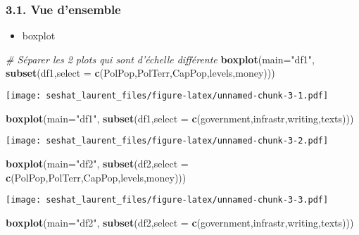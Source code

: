 \documentclass[
]{article}
\newenvironment{Shaded}{\begin{snugshade}}{\end{snugshade}}
\newcommand{\CommentTok}[1]{\textcolor[rgb]{0.56,0.35,0.01}{\textit{#1}}}
\newcommand{\DataTypeTok}[1]{\textcolor[rgb]{0.13,0.29,0.53}{#1}}
\newcommand{\KeywordTok}[1]{\textcolor[rgb]{0.13,0.29,0.53}{\textbf{#1}}}
\newcommand{\NormalTok}[1]{#1}
\newcommand{\StringTok}[1]{\textcolor[rgb]{0.31,0.60,0.02}{#1}}
\providecommand{\tightlist}{%
  \setlength{\itemsep}{0pt}\setlength{\parskip}{0pt}}
\begin{document}
\hypertarget{vue-densemble}{%
\subsubsection{3.1. Vue d'ensemble}\label{vue-densemble}}

\begin{itemize}
\tightlist
\item
  boxplot
\end{itemize}

\begin{Shaded}
\begin{Highlighting}[]
\CommentTok{# Séparer les 2 plots qui sont d'échelle différente}
\KeywordTok{boxplot}\NormalTok{(}\DataTypeTok{main=}\StringTok{"df1"}\NormalTok{, }\KeywordTok{subset}\NormalTok{(df1,}\DataTypeTok{select =} \KeywordTok{c}\NormalTok{(PolPop,PolTerr,CapPop,levels,money)))}
\end{Highlighting}
\end{Shaded}

\texttt{[image: seshat\_laurent\_files/figure-latex/unnamed-chunk-3-1.pdf]}

\begin{Shaded}
\begin{Highlighting}[]
\KeywordTok{boxplot}\NormalTok{(}\DataTypeTok{main=}\StringTok{"df1"}\NormalTok{, }\KeywordTok{subset}\NormalTok{(df1,}\DataTypeTok{select =} \KeywordTok{c}\NormalTok{(government,infrastr,writing,texts)))}
\end{Highlighting}
\end{Shaded}

\texttt{[image: seshat\_laurent\_files/figure-latex/unnamed-chunk-3-2.pdf]}

\begin{Shaded}
\begin{Highlighting}[]
\KeywordTok{boxplot}\NormalTok{(}\DataTypeTok{main=}\StringTok{"df2"}\NormalTok{, }\KeywordTok{subset}\NormalTok{(df2,}\DataTypeTok{select =} \KeywordTok{c}\NormalTok{(PolPop,PolTerr,CapPop,levels,money)))}
\end{Highlighting}
\end{Shaded}

\texttt{[image: seshat\_laurent\_files/figure-latex/unnamed-chunk-3-3.pdf]}

\begin{Shaded}
\begin{Highlighting}[]
\KeywordTok{boxplot}\NormalTok{(}\DataTypeTok{main=}\StringTok{"df2"}\NormalTok{, }\KeywordTok{subset}\NormalTok{(df2,}\DataTypeTok{select =} \KeywordTok{c}\NormalTok{(government,infrastr,writing,texts)))}
\end{Highlighting}
\end{Shaded}
\end{document}
